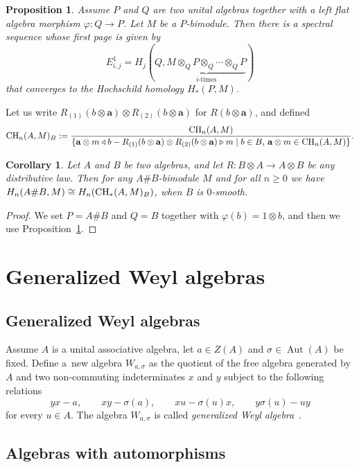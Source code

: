 \documentclass[10pt,a4paper]{amsart}
\newcommand{\CH}{{\rm CH}}
\renewcommand{\geq}{\geqslant}
\numberwithin{equation}{section}
\newtheorem{Corollary}[Theorem]{Corollary}
\newtheorem{Proposition}[Theorem]{Proposition}
 { \theoremstyle{definition}
\newtheorem{Definition}[Theorem]{Definition}
\newtheorem{Example}[Theorem]{Example}
\newtheorem{Remark}[Theorem]{Remark} }
\begin{document}
\begin{Proposition}\label{base2}
 Assume $P$ and $Q$ are two unital algebras together with a left flat algebra morphism
 $\varphi \colon Q \to P$. Let $M$ be a $P$-bimodule. Then there is a spectral sequence
 whose first page is given by
 \[ E^1_{i,j}
 = H_j(Q, \underbrace{M\otimes_Q P\otimes_Q \cdots\otimes_Q P}_{\text{$i$-times}})
 \] that converges to the Hochschild homology $H_*(P, M)$.
\end{Proposition}
Let us write $R_{(1)}(b\otimes\mathbf{a})\otimes R_{(2)}(b\otimes\mathbf{a})$ for
$R(b\otimes \mathbf{a})$, and defined
\[ \CH_n(A,M)_B := \frac{\CH_n(A,M)}{\{\mathbf{a}\otimes m\triangleleft b -
 R_{(1)}(b\otimes\mathbf{a})\otimes R_{(2)}(b\otimes\mathbf{a})\triangleright m \mid b\in B,\,\mathbf{a}\otimes m\in
 \CH_n(A,M)\}}.
\]
\begin{Corollary}\label{base3}
 Let $A$ and $B$ be two algebras, and let $R\colon B \otimes A \to A\otimes B$ be any
 distributive law. Then for any $A\# B$-bimodule $M$ and for all $n \geq 0$ we have
$
 H_n (A\# B, M) \cong H_n(\CH_*(A, M)_B)$,
 when $B$ is $0$-smooth.
\end{Corollary}

\begin{proof}
 We set $P=A\# B$ and $Q=B$ together with $\varphi(b) = 1\otimes b$, and then we use
 Proposition~\ref{base2}.
\end{proof}

\section{Generalized Weyl algebras}\label{sect:GWAs}

\subsection{Generalized Weyl algebras}

Assume $A$ is a unital associative algebra, let $a\in Z(A)$ and $\sigma\in \operatorname{Aut}(A)$ be fixed.
Define a~new algebra $W_{a,\sigma}$ as the quotient of the free algebra generated by $A$ and
two non-commuting indeterminates $x$ and $y$ subject to the following relations
\[%
 yx-a,\qquad xy-\sigma(a),\qquad xu-\sigma(u)x,\qquad y\sigma(u)-uy
\]
 for every $u\in A$. The algebra $W_{a,\sigma}$ is called \emph{generalized
 Weyl algebra}~\cite{Bavula:GWAI, BavulaJordan:IsoProblem}.

\subsection{Algebras with automorphisms}
\end{document}
